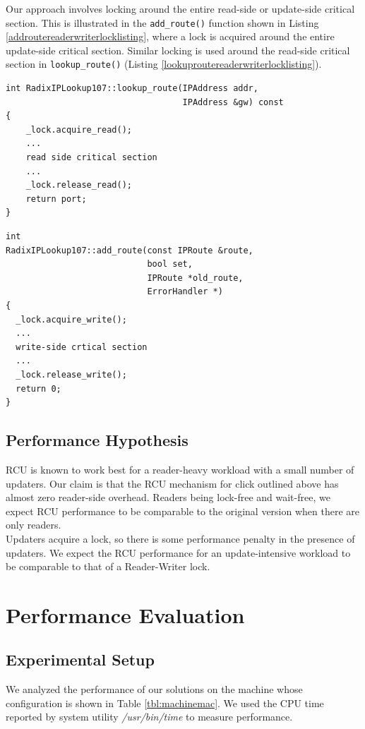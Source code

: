 \documentclass[a4paper]{article}
\begin{document}
Our approach involves locking around the entire read-side or update-side critical section. This is illustrated in the \verb+add_route()+ function shown in Listing \ref{addroutereaderwriterlocklisting}, where a lock is acquired around the entire update-side critical section. Similar locking is used around the read-side critical section in \verb+lookup_route()+ (Listing \ref{lookuproutereaderwriterlocklisting}).
\begin{lstlisting}[caption = Reader-writer lock usage in lookup\_route(), label=lookuproutereaderwriterlocklisting,float=hpt]
int RadixIPLookup107::lookup_route(IPAddress addr, 
                                   IPAddress &gw) const
{  
    _lock.acquire_read();
    ...
    read side critical section
    ...
    _lock.release_read();
    return port;
}
\end{lstlisting}
\begin{lstlisting}[caption = Reader-writer lock usage in add\_route(), label=addroutereaderwriterlocklisting,float=hpt]
int
RadixIPLookup107::add_route(const IPRoute &route, 
                            bool set, 
                            IPRoute *old_route, 
                            ErrorHandler *)
{
  _lock.acquire_write();
  ...
  write-side crtical section
  ...
  _lock.release_write();
  return 0;
}
\end{lstlisting}
\pagebreak  
\subsection{Performance Hypothesis}
\label{sec:perfhypothesis}
RCU is known to work best for a reader-heavy workload with a small number of updaters. Our claim is that the RCU mechanism for click outlined above has almost zero reader-side overhead. Readers being lock-free and wait-free, we expect RCU performance to be comparable to the original version when there are only readers.\\

Updaters acquire a lock, so there is some performance penalty in the presence of updaters. We expect the RCU performance for an update-intensive workload to be comparable to that of a Reader-Writer lock.

\section{Performance Evaluation}
\label{sec:perfeval}
\subsection{Experimental Setup}
We analyzed the performance of our solutions on the machine whose configuration is shown in Table \ref{tbl:machinemac}.
We used the CPU time reported by system utility \emph{/usr/bin/time} to measure performance.
\end{document}
